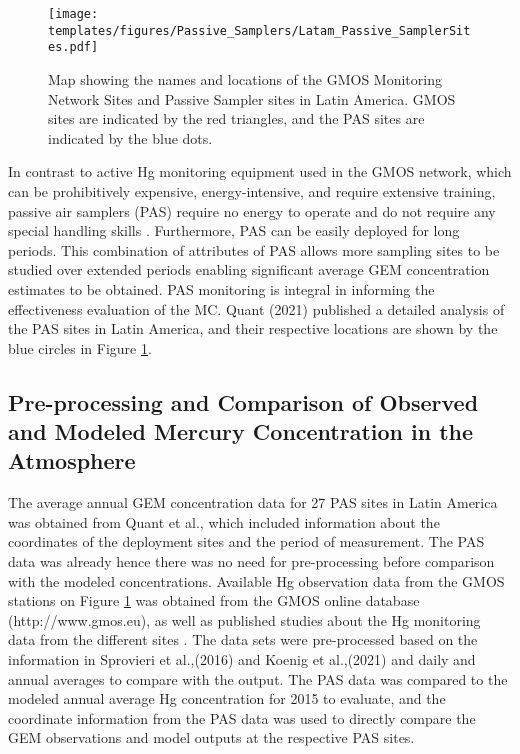 \begin{figure}[H]
 \centering
  \texttt{[image: templates/figures/Passive\_Samplers/Latam\_Passive\_SamplerSites.pdf]}
  \caption{Map showing the names and locations of the GMOS Monitoring Network Sites and Passive Sampler sites in Latin America. GMOS sites are indicated by the red triangles, and the PAS sites are indicated by the blue dots\cite{quant_measuring_2021,koenig_seasonal_2021}.}
  \label{fig:Latam_Passive_SamplerSites}
\end{figure}
\FloatBarrier

\begin{flushleft}
    In contrast to active Hg monitoring equipment used in the GMOS network, which can be prohibitively expensive, energy-intensive, and require extensive training, passive air samplers (PAS) require no energy to operate and do not require any special handling skills \cite{quant_measuring_2021}. Furthermore, PAS can be easily deployed for long periods. This combination of attributes of PAS allows more sampling sites to be studied over extended periods enabling significant average GEM concentration estimates to be obtained. PAS monitoring is integral in informing the effectiveness evaluation of the MC\cite{gustin_measuring_2015,unep_guidance_2021}. Quant (2021) published a detailed analysis of the PAS sites in Latin America, and their respective locations are shown by the blue circles in Figure \ref{fig:Latam_Passive_SamplerSites}. 
\end{flushleft}

\subsection{Pre-processing and Comparison of Observed and Modeled Mercury Concentration in the Atmosphere}\label{c2_observation_data_manipulation}
\begin{flushleft}
  The average annual GEM concentration data for 27 PAS sites in Latin America was obtained from Quant et al.\cite{quant_measuring_2021}, which included information about the coordinates of the deployment sites and the period of measurement. The PAS data was already \nang hence there was no need for pre-processing before comparison with the modeled concentrations. Available Hg observation data from the GMOS stations on Figure  \ref{fig:Latam_Passive_SamplerSites} was obtained from the GMOS online database (http://www.gmos.eu), as well as published studies about the Hg monitoring data from the different sites  \cite{koenig_seasonal_2021}. The data sets were pre-processed based on the information in Sprovieri et al.,(2016) and Koenig et al.,(2021) and daily and annual averages to compare with the \gc output\cite{koenig_seasonal_2021,sprovieri_atmospheric_2016}. The PAS data was compared to the modeled annual average Hg concentration for 2015 to evaluate, and the coordinate information from the PAS data was used to directly compare the GEM observations and model outputs at the respective PAS sites.
\end{flushleft}





